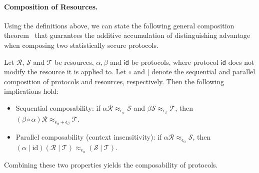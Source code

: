 \paragraph{Composition of Resources.}
Using the definitions above, we can state the following general composition theorem~\cite{MR11abstract} that guarantees the additive accumulation of distinguishing advantage when composing two statistically secure protocols.
\begin{theorem}
  Let $\mathcal{R}$, $\mathcal{S}$ and $\mathcal{T}$ be resources, $\alpha, \beta$ and $\mathsf{id}$ be protocols, where protocol $\mathsf{id}$ does not modify the resource it is applied to.  Let $\circ$ and $|$ denote the sequential and parallel composition of protocols and resources, respectively.  Then the following implications hold:
  \begin{itemize}
  \item Sequential composability: if $\alpha \mathcal{R} \approx_{\epsilon_{\alpha}} \mathcal{S}$ and $\beta\mathcal{S} \approx_{\epsilon_{\beta}} \mathcal{T}$, then $\left(\beta \circ\alpha\right) \mathcal{R} \approx_{\epsilon_{\alpha}+\epsilon_{\beta}}\mathcal{T}$.
  \item Parallel composability (context insensitivity): if $\alpha \mathcal{R} \approx_{\epsilon_{\alpha}} \mathcal{S}$, then $\left(\alpha \mid \mathrm{id}\right)\left(\mathcal{R} \mid \mathcal{T}\right) \approx_{\epsilon_{\alpha}} \left(\mathcal{S} \mid \mathcal{T}\right)$.
  \end{itemize}
  Combining these two properties yields the composability of protocols.
\end{theorem}

